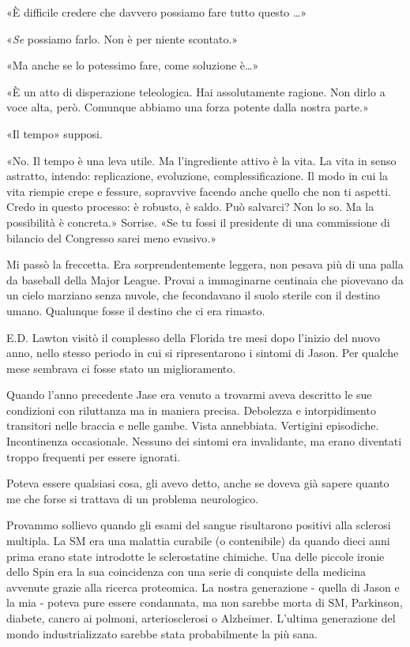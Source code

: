 «È difficile credere che davvero possiamo fare tutto questo \ldots»

«\emph{Se} possiamo farlo. Non è per niente scontato.»

«Ma anche se lo potessimo fare, come soluzione è\ldots»

«È un atto di disperazione teleologica. Hai assolutamente ragione. Non
dirlo a voce alta, però. Comunque abbiamo una forza potente dalla nostra
parte.»

«Il tempo» supposi.

«No. Il tempo è una leva utile. Ma l'ingrediente attivo è la vita. La
vita in senso astratto, intendo: replicazione, evoluzione,
complessificazione. Il modo in cui la vita riempie crepe e fessure,
sopravvive facendo anche quello che non ti aspetti. Credo in questo
processo: è robusto, è saldo. Può salvarci? Non lo so. Ma la possibilità
è concreta.» Sorrise. «Se tu fossi il presidente di una commissione di
bilancio del Congresso sarei meno evasivo.»

Mi passò la freccetta. Era sorprendentemente leggera, non pesava più di
una palla da baseball della Major League. Provai a immaginarne centinaia
che piovevano da un cielo marziano senza nuvole, che fecondavano il
suolo sterile con il destino umano. Qualunque fosse il destino che ci
era rimasto.

\separatorefiori

E.D. Lawton visitò il complesso della Florida tre mesi dopo l'inizio del
nuovo anno, nello stesso periodo in cui si ripresentarono i sintomi di
Jason. Per qualche mese sembrava ci fosse stato un miglioramento.

Quando l'anno precedente Jase era venuto a trovarmi aveva descritto le
sue condizioni con riluttanza ma in maniera precisa. Debolezza e
intorpidimento transitori nelle braccia e nelle gambe. Vista annebbiata.
Vertigini episodiche. Incontinenza occasionale. Nessuno dei sintomi era
invalidante, ma erano diventati troppo frequenti per essere ignorati.

Poteva essere qualsiasi cosa, gli avevo detto, anche se doveva già
sapere quanto me che forse si trattava di un problema neurologico.

Provammo sollievo quando gli esami del sangue risultarono positivi alla
sclerosi multipla. La SM era una malattia curabile (o contenibile) da
quando dieci anni prima erano state introdotte le sclerostatine
chimiche. Una delle piccole ironie dello Spin era la sua coincidenza con
una serie di conquiste della medicina avvenute grazie alla ricerca
proteomica. La nostra generazione - quella di Jason e la mia - poteva
pure essere condannata, ma non sarebbe morta di SM, Parkinson, diabete,
cancro ai polmoni, arteriosclerosi o Alzheimer. L'ultima generazione del
mondo industrializzato sarebbe stata probabilmente la più sana.

